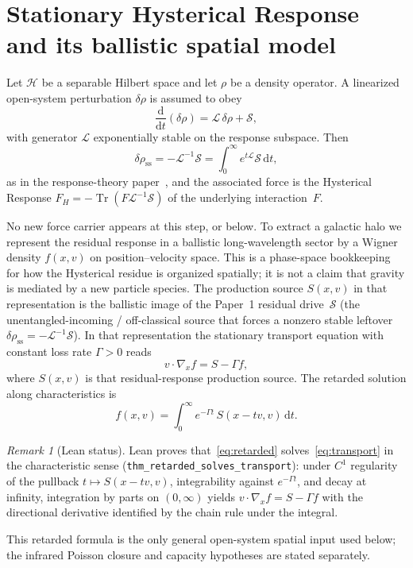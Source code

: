 \documentclass[11pt]{article}
\theoremstyle{definition}
\theoremstyle{remark}
\newtheorem{remark}[theorem]{Remark}
\newcommand{\dd}{\mathrm{d}}
\newcommand{\Tr}{\operatorname{Tr}}
\newcommand{\FH}{F_H}
\begin{document}
\section{Stationary Hysterical Response and its ballistic spatial model}
\label{sec:carrier}
\label{sec:response-sector}
Let $\mathcal H$ be a separable Hilbert space and let $\rho$ be a density operator.
A linearized open-system perturbation $\delta\rho$ is assumed to obey
\begin{equation}
  \frac{\dd}{\dd t}(\delta\rho)=\mathcal L\,\delta\rho+\mathcal S,
\end{equation}
with generator $\mathcal L$ exponentially stable on the response subspace.
Then
\begin{equation}
  \delta\rho_{\mathrm{ss}}=-\mathcal L^{-1}\mathcal S=\int_{0}^{\infty}e^{t\mathcal L}\mathcal S\,\dd t,
\end{equation}
as in the response-theory paper~\cite{boyd2026response}, and the associated force is the Hysterical Response $\FH=-\Tr(F\mathcal L^{-1}\mathcal S)$ of the underlying interaction~$F$.

No new force carrier appears at this step, or below.
To extract a galactic halo we represent the residual response in a ballistic long-wavelength sector by a Wigner density $f(x,v)$ on position--velocity space.
This is a phase-space bookkeeping for how the Hysterical residue is organized spatially; it is not a claim that gravity is mediated by a new particle species.
The production source $S(x,v)$ in that representation is the ballistic image of the Paper~1 residual drive~$\mathcal S$ (the unentangled-incoming / off-classical source that forces a nonzero stable leftover $\delta\rho_{\mathrm{ss}}=-\mathcal L^{-1}\mathcal S$).
In that representation the stationary transport equation with constant loss rate $\Gamma>0$ reads
\begin{equation}
  v\cdot\nabla_{x}f=S-\Gamma f,
  \label{eq:transport}
\end{equation}
where $S(x,v)$ is that residual-response production source.
The retarded solution along characteristics is
\begin{equation}
  f(x,v)=\int_{0}^{\infty}e^{-\Gamma t}\,S(x-tv,v)\,\dd t.
  \label{eq:retarded}
\end{equation}
\begin{remark}[Lean status]
\label{rem:transport-lean}
Lean proves that~\eqref{eq:retarded} solves~\eqref{eq:transport} in the characteristic sense (\texttt{thm\_retarded\_solves\_transport}): under $C^{1}$ regularity of the pullback $t\mapsto S(x-tv,v)$, integrability against $e^{-\Gamma t}$, and decay at infinity, integration by parts on $(0,\infty)$ yields
$v\cdot\nabla_{x}f=S-\Gamma f$ with the directional derivative identified by the chain rule under the integral.
\end{remark}
This retarded formula is the only general open-system spatial input used below; the infrared Poisson closure and capacity hypotheses are stated separately.
\end{document}
